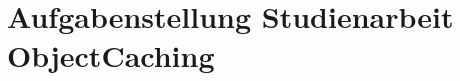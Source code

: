 \documentclass[a4paper,12pt]{article}
\begin{document}
\section*{Aufgabenstellung Studienarbeit ObjectCaching}
\label{sec:aufg-stud-objectc}
\end{document}
